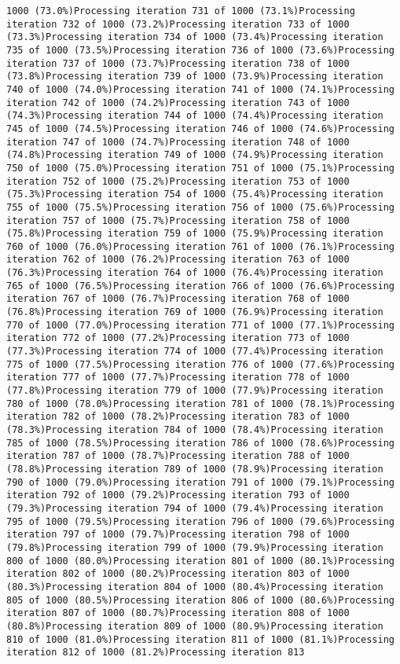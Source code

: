 \documentclass[
]{article}
\begin{document}
\begin{verbatim}
1000 (73.0%)Processing iteration 731 of 1000 (73.1%)Processing iteration 732 of 1000 (73.2%)Processing iteration 733 of 1000 (73.3%)Processing iteration 734 of 1000 (73.4%)Processing iteration 735 of 1000 (73.5%)Processing iteration 736 of 1000 (73.6%)Processing iteration 737 of 1000 (73.7%)Processing iteration 738 of 1000 (73.8%)Processing iteration 739 of 1000 (73.9%)Processing iteration 740 of 1000 (74.0%)Processing iteration 741 of 1000 (74.1%)Processing iteration 742 of 1000 (74.2%)Processing iteration 743 of 1000 (74.3%)Processing iteration 744 of 1000 (74.4%)Processing iteration 745 of 1000 (74.5%)Processing iteration 746 of 1000 (74.6%)Processing iteration 747 of 1000 (74.7%)Processing iteration 748 of 1000 (74.8%)Processing iteration 749 of 1000 (74.9%)Processing iteration 750 of 1000 (75.0%)Processing iteration 751 of 1000 (75.1%)Processing iteration 752 of 1000 (75.2%)Processing iteration 753 of 1000 (75.3%)Processing iteration 754 of 1000 (75.4%)Processing iteration 755 of 1000 (75.5%)Processing iteration 756 of 1000 (75.6%)Processing iteration 757 of 1000 (75.7%)Processing iteration 758 of 1000 (75.8%)Processing iteration 759 of 1000 (75.9%)Processing iteration 760 of 1000 (76.0%)Processing iteration 761 of 1000 (76.1%)Processing iteration 762 of 1000 (76.2%)Processing iteration 763 of 1000 (76.3%)Processing iteration 764 of 1000 (76.4%)Processing iteration 765 of 1000 (76.5%)Processing iteration 766 of 1000 (76.6%)Processing iteration 767 of 1000 (76.7%)Processing iteration 768 of 1000 (76.8%)Processing iteration 769 of 1000 (76.9%)Processing iteration 770 of 1000 (77.0%)Processing iteration 771 of 1000 (77.1%)Processing iteration 772 of 1000 (77.2%)Processing iteration 773 of 1000 (77.3%)Processing iteration 774 of 1000 (77.4%)Processing iteration 775 of 1000 (77.5%)Processing iteration 776 of 1000 (77.6%)Processing iteration 777 of 1000 (77.7%)Processing iteration 778 of 1000 (77.8%)Processing iteration 779 of 1000 (77.9%)Processing iteration 780 of 1000 (78.0%)Processing iteration 781 of 1000 (78.1%)Processing iteration 782 of 1000 (78.2%)Processing iteration 783 of 1000 (78.3%)Processing iteration 784 of 1000 (78.4%)Processing iteration 785 of 1000 (78.5%)Processing iteration 786 of 1000 (78.6%)Processing iteration 787 of 1000 (78.7%)Processing iteration 788 of 1000 (78.8%)Processing iteration 789 of 1000 (78.9%)Processing iteration 790 of 1000 (79.0%)Processing iteration 791 of 1000 (79.1%)Processing iteration 792 of 1000 (79.2%)Processing iteration 793 of 1000 (79.3%)Processing iteration 794 of 1000 (79.4%)Processing iteration 795 of 1000 (79.5%)Processing iteration 796 of 1000 (79.6%)Processing iteration 797 of 1000 (79.7%)Processing iteration 798 of 1000 (79.8%)Processing iteration 799 of 1000 (79.9%)Processing iteration 800 of 1000 (80.0%)Processing iteration 801 of 1000 (80.1%)Processing iteration 802 of 1000 (80.2%)Processing iteration 803 of 1000 (80.3%)Processing iteration 804 of 1000 (80.4%)Processing iteration 805 of 1000 (80.5%)Processing iteration 806 of 1000 (80.6%)Processing iteration 807 of 1000 (80.7%)Processing iteration 808 of 1000 (80.8%)Processing iteration 809 of 1000 (80.9%)Processing iteration 810 of 1000 (81.0%)Processing iteration 811 of 1000 (81.1%)Processing iteration 812 of 1000 (81.2%)Processing iteration 813 
\end{verbatim}
\end{document}
